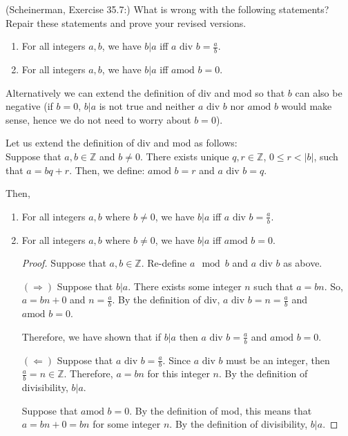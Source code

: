 \documentclass{article}
\newcommand{\Z}{\mathbb{Z}}
\newcommand{\modulo}{\text{mod }}
\newcommand{\divisor}{\text{ div }}
\theoremstyle{definition}
\begin{document}
\begin{question}
    (Scheinerman, Exercise 35.7:)
    What is wrong with the following statements?  Repair these statements and prove your revised versions.
    \begin{enumerate}
	\item For all integers $a, b$, we have $b |a$ iff  $a \divisor b = \frac{a}{b}$.
	\item For all integers $a, b$, we have $b|a$ iff $a \modulo b = 0$.
    \end{enumerate}
\end{question}
\begin{solution}
Alternatively we can extend the definition of div and mod so that $b$ can also be negative (if $b = 0$, $b|a$ is not true and neither $a \divisor b$ nor $a \modulo b$ would make sense, hence we do not need to worry about $b = 0$).

 Let us extend the definition of div and mod as follows:\\
 Suppose that $a, b \in \Z$ and $b \neq 0$.  There exists unique $q, r \in \Z$, {\color{blue}$0 \leq r < |b|$}, such that $a = bq + r$.  Then, we define: $a \modulo b = r$ and $a \divisor b = q$.
  
Then,\begin{enumerate}
	\item For all integers $a, b$ where $b\neq 0$, we have $b |a$ iff  $a \divisor b = \frac{a}{b}$.
	\item For all integers $a, b$ where $b \neq 0$, we have $b|a$ iff $a \modulo b = 0$.
	\begin{proof}  Suppose that $a, b \in \Z$.  Re-define $a \mod b$ and $a \divisor b$ as above.
	
	$(\Rightarrow)$ Suppose that $b|a$.  There exists some integer $n$ such that $a = bn$.  So, $a = bn + 0$ and $n = \frac{a}{b}$.  By the definition of div, $a \divisor b = n = \frac{a}{b}$ and $a \modulo b = 0$.
	
	Therefore, we have shown that if $b|a$ then $a \divisor b = \frac{a}{b}$ and $a \modulo b = 0$.
	
	$(\Leftarrow)$ Suppose that $a \divisor b = \frac{a}{b}$.  Since $a \divisor b$ must be an integer, then $\frac{a}{b} = n \in \Z$.  Therefore, $a = bn$ for this integer $n$.  By the definition of divisibility, $b | a$.
	
	Suppose that $a \modulo b = 0$.  By the definition of mod, this means that $a = bn + 0 = bn$ for some integer $n$.  By the definition of divisibility, $b | a$.
	\end{proof}
\end{enumerate}
\end{solution}
\end{document}
